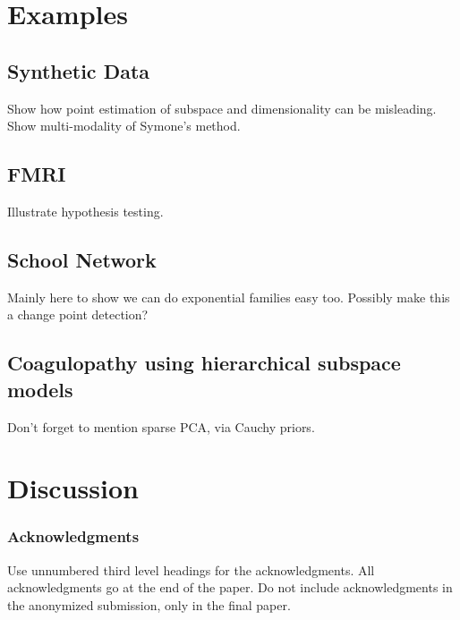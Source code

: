 \documentclass{article}
\begin{document}
\section{Examples}

\subsection{Synthetic Data}
Show how point estimation of subspace and dimensionality can be misleading. Show multi-modality of Symone's method.

\subsection{FMRI}
Illustrate hypothesis testing.

\subsection{School Network}
Mainly here to show we can do exponential families easy too. Possibly make this a change point detection?

\subsection{Coagulopathy using hierarchical subspace models}
Don't forget to mention sparse PCA, via Cauchy priors.

\section{Discussion}

\subsubsection*{Acknowledgments}

Use unnumbered third level headings for the acknowledgments. All
acknowledgments go at the end of the paper. Do not include
acknowledgments in the anonymized submission, only in the final paper.


\end{document}
